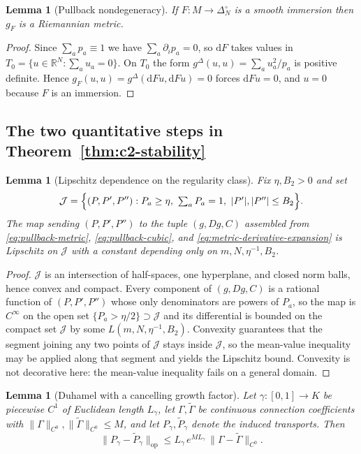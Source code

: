 \documentclass[11pt]{article}
\newtheorem{lemma}[theorem]{Lemma}
\theoremstyle{definition}
\theoremstyle{remark}
\newcommand{\simplex}{\Delta_{N}^{\circ}}
\newcommand{\R}{\mathbb{R}}
\newcommand{\op}{\mathrm{op}}
\newcommand{\dd}{\mathrm{d}}
\begin{document}
\begin{lemma}[Pullback nondegeneracy]\label{lem:pullback-nondegenerate}
If $F:M\to\simplex$ is a smooth immersion then $g_F$ is a Riemannian metric.
\end{lemma}

\begin{proof}
Since $\sum_ap_a\equiv1$ we have $\sum_a\partial_ip_a=0$, so $\dd F$ takes
values in $T_0=\{u\in\R^N:\sum_au_a=0\}$. On $T_0$ the form
$g^\Delta(u,u)=\sum_au_a^2/p_a$ is positive definite. Hence
$g_F(u,u)=g^\Delta(\dd Fu,\dd Fu)=0$ forces $\dd Fu=0$, and $u=0$ because $F$
is an immersion.
\end{proof}

\subsection{The two quantitative steps in Theorem~\ref{thm:c2-stability}}

\begin{lemma}[Lipschitz dependence on the regularity class]\label{lem:lipschitz-class}
Fix $\eta,B_2>0$ and set
\begin{equation}
    \mathcal J
    =\Bigl\{(P,P',P''):
      P_a\ge\eta,\ \textstyle\sum_aP_a=1,\
      |P'|,|P''|\le B_2\Bigr\}.
\end{equation}
The map sending $(P,P',P'')$ to the tuple $(g,Dg,C)$ assembled from
\eqref{eq:pullback-metric}, \eqref{eq:pullback-cubic}, and
\eqref{eq:metric-derivative-expansion} is Lipschitz on $\mathcal J$ with a
constant depending only on $m,N,\eta^{-1},B_2$.
\end{lemma}

\begin{proof}
$\mathcal J$ is an intersection of half-spaces, one hyperplane, and closed norm
balls, hence convex and compact. Every component of $(g,Dg,C)$ is a rational
function of $(P,P',P'')$ whose only denominators are powers of $P_a$, so the
map is $C^\infty$ on the open set $\{P_a>\eta/2\}\supset\mathcal J$ and its
differential is bounded on the compact set $\mathcal J$ by some
$L(m,N,\eta^{-1},B_2)$. Convexity guarantees that the segment joining any two
points of $\mathcal J$ stays inside $\mathcal J$, so the mean-value inequality
may be applied along that segment and yields the Lipschitz bound. Convexity is
not decorative here: the mean-value inequality fails on a general domain.
\end{proof}

\begin{lemma}[Duhamel with a cancelling growth factor]\label{lem:duhamel-cancellation}
Let $\gamma:[0,1]\to K$ be piecewise $C^1$ of Euclidean length $L_\gamma$, let
$\Gamma,\widetilde\Gamma$ be continuous connection coefficients with
$\|\Gamma\|_{C^0},\|\widetilde\Gamma\|_{C^0}\le M$, and let
$P_\gamma,\widetilde P_\gamma$ denote the induced transports. Then
\begin{equation}
    \|P_\gamma-\widetilde P_\gamma\|_{\op}
    \le L_\gamma\,e^{ML_\gamma}\,
      \|\Gamma-\widetilde\Gamma\|_{C^0}.
\end{equation}
\end{lemma}
\end{document}
